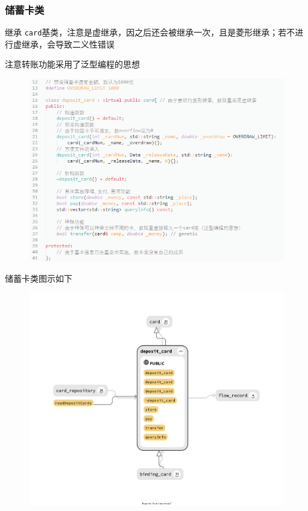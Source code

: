 \documentclass[11pt,UTF8]{ctexart}
\begin{document}
\subsubsection{储蓄卡类}
\par 继承 \verb'card'基类，注意是虚继承，因之后还会被继承一次，且是菱形继承；若不进行虚继承，会导致二义性错误
\par 注意转账功能采用了泛型编程的思想
\begin{figure}[H]
\centering
\includegraphics[width=0.9\linewidth]{pic/deposit_card.PNG}
\end{figure}
\par 储蓄卡类图示如下
\begin{figure}[H]
\centering
\includegraphics[width=0.8\linewidth]{pic/deposit_card_class.PNG}
\end{figure}
\end{document}
